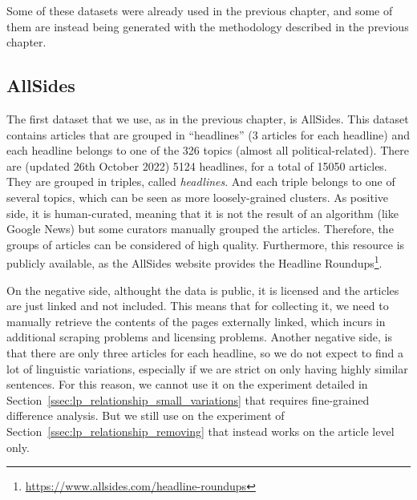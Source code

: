 Some of these datasets were already used in the previous chapter, and some of them are instead being generated with the methodology described in the previous chapter.



\subsection{AllSides}

The first dataset that we use, as in the previous chapter, is AllSides.
This dataset contains articles that are grouped in “headlines” (3 articles for each headline) and each headline belongs to one of the 326 topics (almost all political-related). There are (updated 26th October 2022) 5124 headlines, for a total of 15050 articles. They are grouped in triples, called \emph{headlines}. And each triple belongs to one of several topics, which can be seen as more loosely-grained clusters. 
As positive side, it is human-curated, meaning that it is not the result of an algorithm (like Google News) but some curators manually grouped the articles. Therefore, the groups of articles can be considered of high quality.
Furthermore, this resource is publicly available, as the AllSides website provides the Headline Roundups\footnote{\url{https://www.allsides.com/headline-roundups}}.

On the negative side, althought the data is public, it is licensed and the articles are just linked and not included.
This means that for collecting it, we need to manually retrieve the contents of the pages externally linked, which incurs in additional scraping problems and licensing problems.
Another negative side, is that there are only three articles for each headline, so we do not expect to find a lot of linguistic variations, especially if we are strict on only having highly similar sentences. For this reason, we cannot use it on the experiment detailed in Section~\ref{ssec:lp_relationship_small_variations} that requires fine-grained difference analysis. But we still use on the experiment of Section~\ref{ssec:lp_relationship_removing} that instead works on the article level only.

